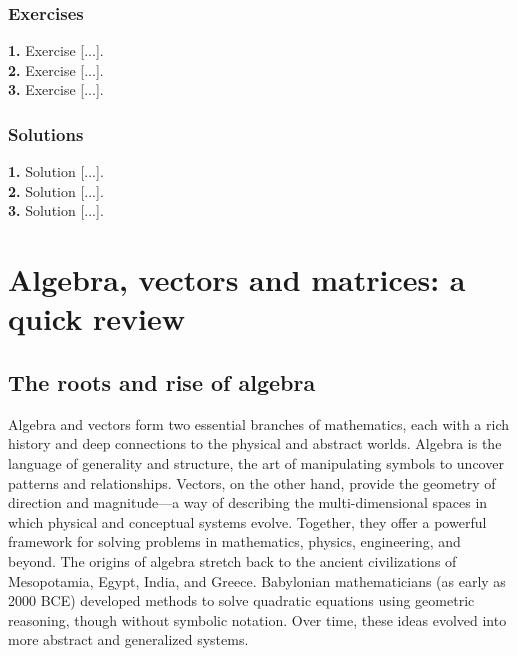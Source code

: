 \documentclass{book}
\begin{document}
\newpage

\subsection*{Exercises}

\textbf{1.} Exercise [...].\\

\textbf{2.} Exercise [...].\\

\textbf{3.} Exercise [...].\\

\newpage

\subsection*{Solutions}

\textbf{1.} Solution [...].\\

\textbf{2.} Solution [...].\\

\textbf{3.} Solution [...].\\

\newpage




\appendix

\chapter{Algebra, vectors and matrices: a quick review}

\section{The roots and rise of algebra}

Algebra and vectors form two essential branches of mathematics, each with a rich history and deep connections to the physical and abstract worlds. Algebra is the language of generality and structure, the art of manipulating symbols to uncover patterns and relationships. Vectors, on the other hand, provide the geometry of direction and magnitude---a way of describing the multi-dimensional spaces in which physical and conceptual systems evolve. Together, they offer a powerful framework for solving problems in mathematics, physics, engineering, and beyond. The origins of algebra stretch back to the ancient civilizations of Mesopotamia, Egypt, India, and Greece. Babylonian mathematicians (as early as 2000 BCE) developed methods to solve quadratic equations using geometric reasoning, though without symbolic notation. Over time, these ideas evolved into more abstract and generalized systems.\\
\end{document}
